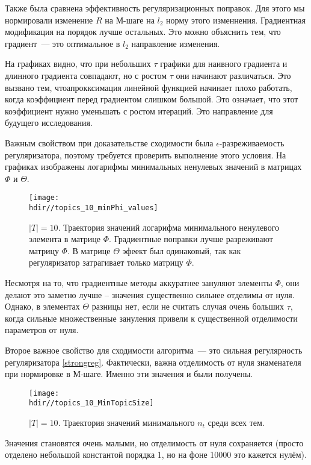 \documentclass[12pt, twoside]{article}
\newcommand{\hdir}{.}
\begin{document}
Также была сравнена эффективность регуляризационных поправок. Для этого мы нормировали изменение $R$ на М-шаге на $l_2$ норму этого изменнения. Градиентная модификация на порядок лучше остальных. Это можно объяснить тем, что градиент~--- это оптимальное в $l_2$ направление изменения.

На графиках видно, что при небольших $\tau$ графики для наивного градиента и длинного градиента совпадают, но с ростом $\tau$ они начинают различаться. Это вызвано тем, чтоапрокксимация линейной функцией начинает плохо работать, когда коэффициент перед градиентом слишком большой. Это означает, что этот коэффициент нужно уменьшать с ростом итераций. Это направление для будущего исследования.

Важным свойством при доказательстве сходимости была $\epsilon$-разреживаемость регуляризатора, поэтому требуется проверить выполнение этого условия. На графиках изображены логарифмы минимальных ненулевых значений в матрицах $\Phi$ и $\Theta$.
\begin{figure}[!ht]
	\centering
	\texttt{[image: \\hdir//topics\_10\_minPhi\_values]}
	\caption{$|T| = 10$. Траектория значений логарифма минимального ненулевого элемента в матрице $\Phi$. Градиентные поправки лучше разреживают матрицу $\Phi$. В матрице $\Theta$ эфеект был одинаковый, так как регуляризатор затрагивает только матрицу $\Phi$.}    
\end{figure}
Несмотря на то, что градиентные методы аккуратнее  зануляют элементы $\Phi$, они делают это заметно лучше -- значения существенно сильнее отделимы от нуля. Однако, в элементах $\Theta$ разницы нет, если не считать случая очень больших $\tau$, когда сильные множественные зануления привели к существенной отделимости параметров от нуля.

Второе важное свойство для сходимости алгоритма~--- это сильная регулярность регуляризатора \ref{strongreg}. Фактически, важна отделимость от нуля знаменателя при нормировке в М-шаге. Именно эти значения  и были получены.

\begin{figure}[!ht]
	\centering  
	\texttt{[image: \\hdir//topics\_10\_MinTopicSize]}
	\caption{$|T| = 10$. Траектория значений минимального $n_t$ среди всех тем.}  
\end{figure}

Значения становятся очень малыми, но отделимость от нуля сохраняется (просто отделено небольшой константой порядка 1, но на фоне 10000 это кажется нулём). 
\end{document}
